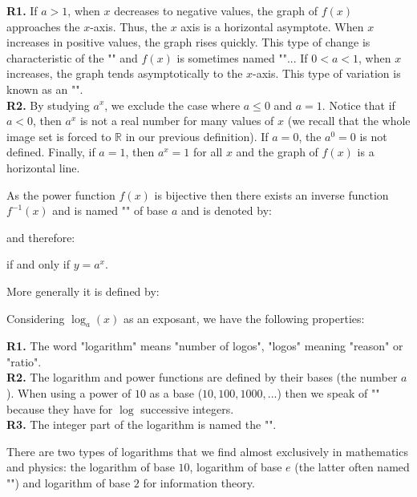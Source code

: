 	\begin{tcolorbox}[title=Remarks,colframe=black,arc=10pt]
	\textbf{R1.} If $a>1$, when $x$ decreases to negative values, the graph of $f (x)$ approaches the $x$-axis. Thus, the $x$ axis is a horizontal asymptote. When $x$ increases in positive values, the graph rises quickly. This type of change is characteristic of the "" and $f(x)$ is sometimes named ""... If $0<a<1$, when $x$ increases, the graph tends asymptotically to the $x$-axis. This type of variation is known as an "".\\
	
	\textbf{R2.} By studying $a^x$, we exclude the case where $a\leq 0$ and $a=1$. Notice that if $a<0$, then $a^x$ is not a real number for many values of $x$ (we recall that the whole image set is forced to $\mathbb{R}$ in our previous definition). If $a=0$, the $a^0=0$ is not defined. Finally, if $a=1$, then $a^x=1$ for all $x$ and the graph of $f(x)$ is a horizontal line.
	\end{tcolorbox}
	As the power function $f (x)$ is bijective then there exists an inverse function $f^{-1}(x)$ and is named "" of base $a$ and is denoted by:
	
	and therefore:
	
	if and only if $y=a^x$.
	
	More generally it is defined by:
	
	
	Considering $\log_a(x)$ as an exposant, we have the following properties:	
	
	\begin{tcolorbox}[title=Remarks,colframe=black,arc=10pt]
	\textbf{R1.} The word "logarithm" means "number of logos", "logos" meaning "reason" or "ratio".\\
	
	\textbf{R2.} The logarithm and power functions are defined by their bases (the number $a$). When using a power of $10$ as a base ($10, 100, 1000, ...$) then we speak of "" because they have for $\log$ successive integers.\\
	
	\textbf{R3.} The integer part of the logarithm is named the "".
	\end{tcolorbox}
	There are two types of logarithms that we find almost exclusively in mathematics and physics: the logarithm of base $10$, logarithm of base $e$ (the latter often named "") and logarithm of base $2$ for information theory.
	
